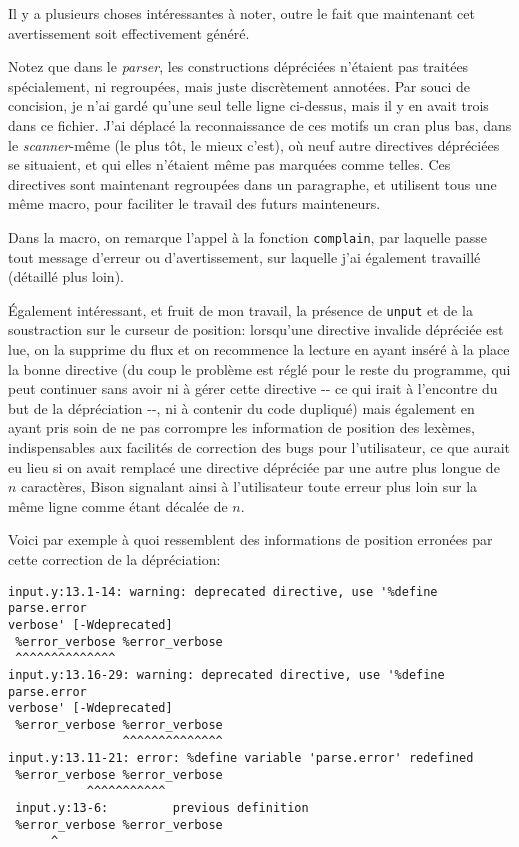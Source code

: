\documentclass[a4paper,11pt,twoside,final]{article}
\begin{document}
  Il y a plusieurs choses intéressantes à noter, outre le fait que maintenant
  cet avertissement soit effectivement généré.

  Notez que dans le \textit{parser}, les constructions dépréciées n'étaient pas
  traitées spécialement, ni regroupées, mais juste discrètement annotées. Par
  souci de concision, je n'ai gardé qu'une seul telle ligne ci-dessus, mais il
  y en avait trois dans ce fichier. J'ai déplacé la reconnaissance de ces
  motifs un cran plus bas, dans le \textit{scanner}-même (le plus tôt, le
  mieux c'est), où neuf autre directives dépréciées se situaient, et qui elles
  n'étaient même pas marquées comme telles. Ces directives sont maintenant
  regroupées dans un paragraphe, et utilisent tous une même macro, pour
  faciliter le travail des futurs mainteneurs.

  Dans la macro, on remarque l'appel à la fonction \texttt{complain}, par
  laquelle passe tout message d'erreur ou d'avertissement, sur laquelle j'ai
  également travaillé (détaillé plus loin).

  Également intéressant, et fruit de mon travail, la présence de \texttt{unput}
  et de la soustraction sur le curseur de position: lorsqu'une directive
  invalide dépréciée est lue, on la supprime du flux et on recommence la
  lecture en ayant inséré à la place la bonne directive (du coup le problème est
  réglé pour le reste du programme, qui peut continuer sans avoir ni à gérer
  cette directive -{}- ce qui irait à l'encontre du but de la dépréciation
  -{}-, ni à contenir du code dupliqué) mais également en ayant pris soin de ne
  pas corrompre les information de position des lexèmes, indispensables aux
  facilités de correction des bugs pour l'utilisateur, ce que aurait eu lieu si
  on avait remplacé une directive dépréciée par une autre plus longue de $n$
  caractères, Bison signalant ainsi à l'utilisateur toute erreur plus loin sur
  la même ligne comme étant décalée de $n$.

  Voici par exemple à quoi ressemblent des informations de position erronées
  par cette correction de la dépréciation:

  \begin{verbatim}
input.y:13.1-14: warning: deprecated directive, use '%define parse.error
verbose' [-Wdeprecated]
 %error_verbose %error_verbose
 ^^^^^^^^^^^^^^
input.y:13.16-29: warning: deprecated directive, use '%define parse.error
verbose' [-Wdeprecated]
 %error_verbose %error_verbose
                ^^^^^^^^^^^^^^
input.y:13.11-21: error: %define variable 'parse.error' redefined
 %error_verbose %error_verbose
           ^^^^^^^^^^^
 input.y:13-6:         previous definition
 %error_verbose %error_verbose
      ^
  \end{verbatim}
\end{document}
